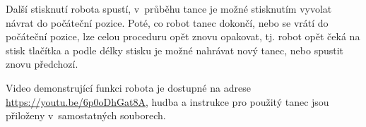 \documentclass[12pt,a4paper]{report}
\begin{document}
Další stisknutí robota spustí, v~průběhu tance je možné stisknutím vyvolat návrat do počáteční pozice. Poté, co robot tanec dokončí, nebo se vrátí do počáteční pozice, lze celou proceduru opět znovu opakovat, tj. robot opět čeká na stisk tlačítka a podle délky stisku je možné nahrávat nový tanec, nebo spustit znovu předchozí.

Video demonstrující funkci robota je dostupné na adrese \url{https://youtu.be/6p0oDhGat8A}, hudba a instrukce pro použitý tanec jsou přiloženy v~samostatných souborech.
\end{document}
